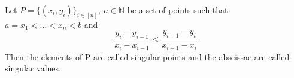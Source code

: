 \begin{defn}
  Let $ P = \{ (x_i, y_i)  \}_{i \in [n]} $, $ n \in \mathbb{N} $ be a set of points such that $ a = x_1 < \dots < x_n < b $ and
  \begin{equation}
    \frac{y_{i} - y_{i-1}}{x_{i} - x_{i-1}} \leq \frac{y_{i+1} - y_{i}}{x_{i+1} - x_{i}}
  \end{equation}
  Then the elements of P are called singular points and the abscissae are called singular values.
\end{defn}



